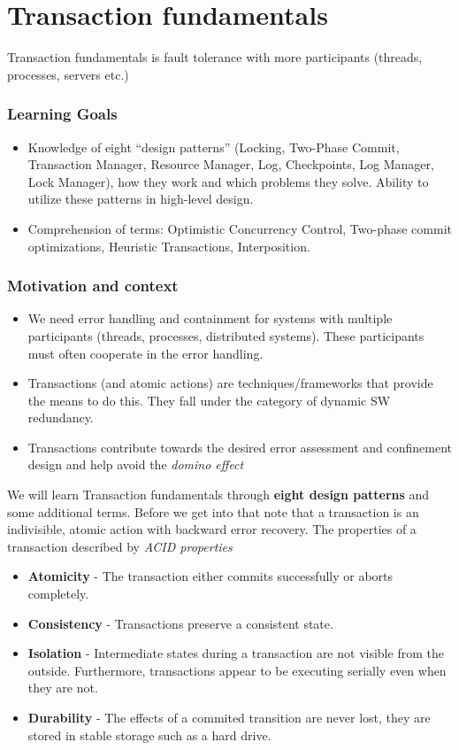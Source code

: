 \part{Transaction fundamentals}
Transaction fundamentals is fault tolerance with more participants (threads, processes, servers etc.)

\section{Learning Goals}
\begin{itemize}
\item Knowledge of eight “design patterns” (Locking, Two-Phase Commit, Transaction Manager, Resource Manager, Log, Checkpoints, Log Manager, Lock Manager), how they work and which problems they solve. Ability to utilize these patterns in high-level design. 
\item Comprehension of terms: Optimistic Concurrency Control, Two-phase commit optimizations, Heuristic Transactions, Interposition.
\end{itemize}

\section{Motivation and context}
\begin{itemize}
\item We need error handling and containment for systems with multiple participants (threads, processes, distributed systems). These participants must often cooperate in the error handling.
\item Transactions (and atomic actions) are techniques/frameworks that provide the means to do this. They fall under the category of dynamic SW redundancy. 
\item Transactions contribute towards the desired error assessment and confinement design and help avoid the \textit{domino effect}
\end{itemize}

We will learn Transaction fundamentals through \textbf{eight design patterns} and some additional terms. Before we get into that note that a transaction is an indivisible, atomic action with backward error recovery. The properties of a transaction described by \textit{ACID properties}
\begin{itemize}
\item \textbf{Atomicity} -  The transaction either commits successfully or aborts completely.
\item \textbf{Consistency} - Transactions preserve a consistent state.
\item \textbf{Isolation} - Intermediate states during a transaction are not visible from the outside. Furthermore, transactions appear to be executing serially even when they are not.
\item \textbf{Durability} - The effects of a commited transition are never lost, they are stored in stable storage such as a hard drive.
\end{itemize}

